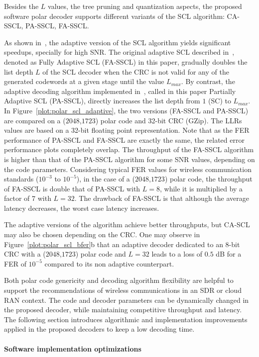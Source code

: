 Besides the $L$ values, the tree pruning and quantization aspects, the proposed
software polar decoder supports different variants of the SCL algorithm:
CA-SSCL, PA-SSCL, FA-SSCL.

As shown in~\cite{Sarkis2016}, the adaptive version of the SCL algorithm yields
significant speedups, specially for high SNR. The original adaptive SCL
described in~\cite{Li2012}, denoted as Fully Adaptive SCL (FA-SSCL) in this
paper, gradually doubles the list depth $L$ of the SCL decoder when the CRC is
not valid for any of the generated codewords at a given stage until the value
$L_{max}$. By contrast, the adaptive decoding algorithm implemented
in~\cite{Sarkis2016}, called in this paper Partially Adaptive SCL (PA-SSCL),
directly increases the list depth from $1$ (SC) to $L_{max}$. In
Figure~\ref{plot:polar_scl_adaptive}, the two versions (FA-SSCL and PA-SSCL) are
compared on a ($2048$,$1723$) polar code and 32-bit CRC (GZip). The LLRs values
are based on a 32-bit floating point representation. Note that as the FER
performance of PA-SSCL and FA-SSCL are exactly the same, the related error
performance plots completely overlap. The throughput of the FA-SSCL algorithm is
higher than that of the PA-SSCL algorithm for some SNR values, depending on the
code parameters. Considering typical FER values for wireless communication
standards ($10^{-3}$ to $10^{-5}$), in the case of a ($2048$,$1723$) polar code,
the throughput of FA-SSCL is double that of PA-SSCL with $L = 8$, while it is
multiplied by a factor of $7$ with $L=32$. The drawback of FA-SSCL is that
although the average latency decreases, the worst case latency increases.

The adaptive versions of the algorithm achieve better throughputs, but CA-SCL
may also be chosen depending on the CRC. One may observe in
Figure~\ref{plot:polar_scl_bfer}b that an adaptive decoder dedicated to an 8-bit
CRC with a ($2048$,$1723$) polar code and $L=32$ leads to a loss of $0.5$ dB for
a FER of $10^{-5}$ compared to its non adaptive counterpart.

Both polar code genericity and decoding algorithm flexibility are helpful to
support the recommendations of wireless communications in an SDR or cloud RAN
context. The code and decoder parameters can be dynamically changed in the
proposed decoder, while maintaining competitive throughput and latency. The
following section introduces algorithmic and implementation improvements applied
in the proposed decoders to keep a low decoding time.

\paragraph{Software implementation optimizations}
\label{sec:implem_improv}

